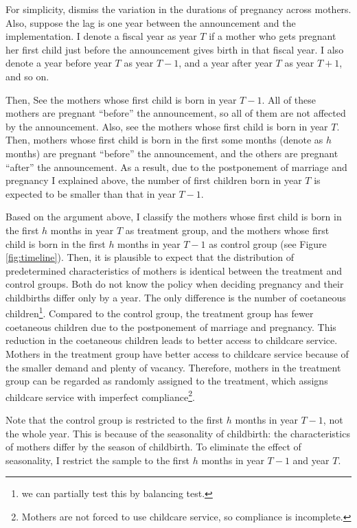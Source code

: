 \documentclass[12pt]{article}
\begin{document}
For simplicity, dismiss the variation in the durations of pregnancy across mothers. 
Also, suppose the lag is one year between the announcement and the implementation.
I denote a fiscal year as year $T$ if a mother who gets pregnant her first child just before the announcement gives birth in that fiscal year.
I also denote a year before year $T$ as year $T-1$, and a year after year $T$ as year $T+1$, and so on.


Then, See the mothers whose first child is born in year $T-1$. 
All of these mothers are pregnant ``before'' the announcement, so all of them are not affected by the announcement.
Also, see the mothers whose first child is born in year $T$. 
Then, mothers whose first child is born in the first some months (denote as $h$ months) are pregnant ``before'' the announcement, and the others are pregnant ``after'' the announcement.
As a result, due to the postponement of marriage and pregnancy I explained above, the number of first children born in year $T$ is expected to be smaller than that in year $T-1$.


Based on the argument above, I classify the mothers whose first child is born in the first $h$ months in year $T$ as treatment group, and the mothers whose first child is born in the first $h$ months in year $T-1$ as control group (see Figure \ref{fig:timeline}).
Then, it is plausible to expect that the distribution of predetermined characteristics of mothers is identical between the treatment and control groups.
Both do not know the policy when deciding pregnancy and their childbirths differ only by a year.
The only difference is the number of coetaneous children\footnote{we can partially test this by balancing test.}. 
Compared to the control group, the treatment group has fewer coetaneous children due to the postponement of marriage and pregnancy.
This reduction in the coetaneous children leads to better access to childcare service. 
Mothers in the treatment group have better access to childcare service because of the smaller demand and plenty of vacancy. 
Therefore, mothers in the treatment group can be regarded as randomly assigned to the treatment, which assigns childcare service with imperfect compliance\footnote{Mothers are not forced to use childcare service, so compliance is incomplete.}.


Note that the control group is restricted to the first $h$ months in year $T-1$, not the whole year.
This is because of the seasonality of childbirth: the characteristics of mothers differ by the season of childbirth\cite{Buckles2013-tj}. 
To eliminate the effect of seasonality, I restrict the sample to the first $h$ months in year $T-1$ and year $T$.
\end{document}
